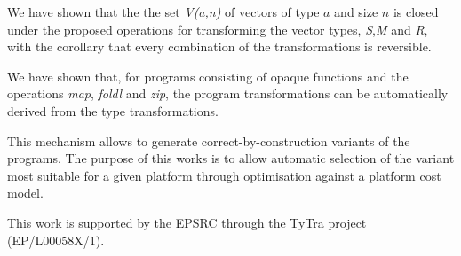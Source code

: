 \documentclass{article}
\begin{document}
We have shown that the the set \emph{V(a,n)} of vectors of type $a$ and size $n$ is closed under the proposed operations for transforming the vector types, \emph{S},\emph{M} and \emph{R}, with the corollary that every combination of the transformations is reversible.

We have shown that, for programs consisting of opaque functions and the operations \emph{map}, \emph{foldl} and \emph{zip}, the program transformations can be automatically derived from the type transformations.

This mechanism allows to generate correct-by-construction variants of the programs. The purpose of this works is to allow automatic selection of the variant most suitable for a given platform through optimisation against a platform cost model.

This work is supported by the EPSRC through the TyTra project (EP/L00058X/1).



\end{document}
